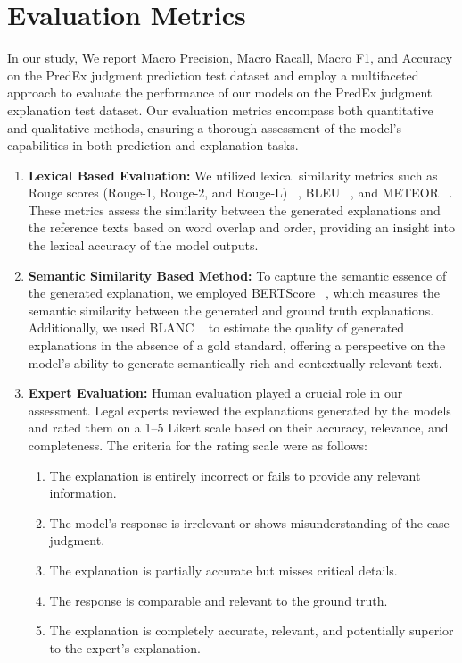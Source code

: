 \section{Evaluation Metrics}
\label{sec:performance_metrics}
In our study, We report Macro Precision, Macro Racall, Macro F1, and Accuracy on the PredEx judgment prediction test dataset and employ a multifaceted approach to evaluate the performance of our models on the PredEx judgment explanation test dataset. Our evaluation metrics encompass both quantitative and qualitative methods, ensuring a thorough assessment of the model's capabilities in both prediction and explanation tasks.

\begin{enumerate}
    \item \textbf{Lexical Based Evaluation:}
    We utilized lexical similarity metrics such as Rouge scores (Rouge-1, Rouge-2, and Rouge-L) ~\cite{lin-2004-rouge}, BLEU ~\cite{papineni-etal-2002-bleu}, and METEOR ~\cite{banerjee-lavie-2005-meteor}. These metrics assess the similarity between the generated explanations and the reference texts based on word overlap and order, providing an insight into the lexical accuracy of the model outputs.

    \item \textbf{Semantic Similarity Based Method:}
    To capture the semantic essence of the generated explanation, we employed BERTScore ~\cite{BERTScore}, which measures the semantic similarity between the generated and ground truth explanations. Additionally, we used BLANC ~\cite{blanc} to estimate the quality of generated explanations in the absence of a gold standard, offering a perspective on the model's ability to generate semantically rich and contextually relevant text.

    \item \textbf{Expert Evaluation:}
    Human evaluation played a crucial role in our assessment. Legal experts reviewed the explanations generated by the models and rated them on a 1–5 Likert scale based on their accuracy, relevance, and completeness. The criteria for the rating scale were as follows:
    \begin{enumerate}[label=\arabic*.]
        \item The explanation is entirely incorrect or fails to provide any relevant information.
        \item The model's response is irrelevant or shows misunderstanding of the case judgment.
        \item The explanation is partially accurate but misses critical details.
        \item The response is comparable and relevant to the ground truth.
        \item The explanation is completely accurate, relevant, and potentially superior to the expert's explanation.
    \end{enumerate}
    

\end{enumerate}
